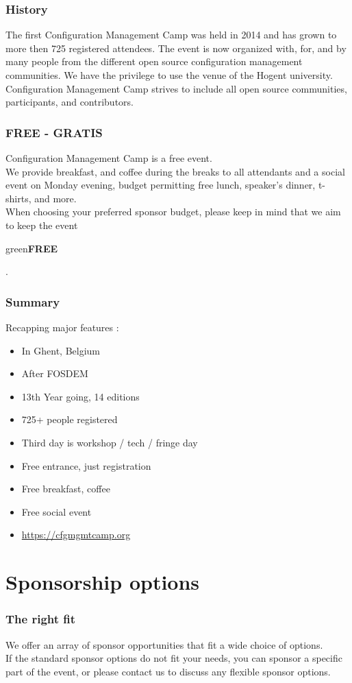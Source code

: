 \begin{frame}
\frametitle{History}
The first Configuration Management Camp was held in 2014 and has grown to more then 725 registered attendees.
The event is now organized with, for, and by many people from the different open source configuration management communities.
We have the privilege to use the venue of the Hogent university.
Configuration Management Camp strives to include all open source communities, participants, and contributors.
\end{frame}

\begin{frame}
\frametitle{FREE - GRATIS}
Configuration Management Camp is a free event.\\
We provide breakfast, and coffee during the breaks to all attendants and a social event on Monday evening,
budget permitting free lunch, speaker's dinner, t-shirts, and more.\\
When choosing your preferred sponsor budget, please keep in mind that we aim to keep the event \begin{color}{green}\textbf{FREE}\end{color}.\\
\end{frame}

\begin{frame}
\frametitle{Summary}
Recapping major features :
\begin{itemize}
	\item<+->
	In Ghent, Belgium
	\item<+->
	After FOSDEM
	\item<+->
	13th Year going, 14 editions
	\item<+->
	725+ people registered
	\item<+->
	Third day is workshop / tech / fringe day
	\item<+->
	Free entrance, just registration
	\item<+->
	Free breakfast, coffee
	\item<+->
	Free social event
	\item<+->
	\url{https://cfgmgmtcamp.org}
\end{itemize}
\end{frame}

\section{Sponsorship options}

\begin{frame}
\frametitle{The right fit}
We offer an array of sponsor opportunities that fit a wide choice of options.\\
If the standard sponsor options do not fit your needs, you can sponsor a specific part of the event, or 
please contact us to discuss any flexible sponsor options.
\end{frame}

